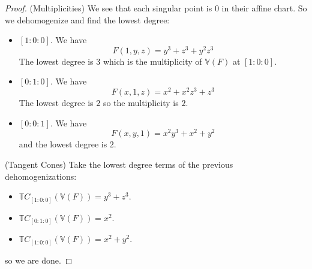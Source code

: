 \documentclass{article}
\begin{document}
\begin{itemize}
\begin{proof}
                (Multiplicities) We see that each singular point is $0$ in their affine chart. So we dehomogenize and find the lowest degree:
                    \begin{itemize}
                        \item $[1 : 0 : 0]$. We have
                            \begin{equation*}
                                F(1, y, z) = y^{3} + z^{3} + y^{2}z^{3}
                            \end{equation*}
                        The lowest degree is $3$ which is the multiplicity of $\mathbb{V}(F)$ at $[1 : 0 : 0]$.

                        \item $[0 : 1 : 0]$. We have
                            \begin{equation*}
                                F(x, 1, z) = x^{2} + x^{2}z^{3} + z^{3}
                            \end{equation*}
                        The lowest degree is $2$ so the multiplicity is $2$.

                        \item $[0 : 0 : 1]$. We have 
                            \begin{equation*}
                                F(x, y, 1) = x^{2}y^{3} + x^{2} + y^{2}
                            \end{equation*}
                        and the lowest degree is $2$.
                    \end{itemize}
                (Tangent Cones) Take the lowest degree terms of the previous dehomogenizations:
                    \begin{itemize}
                        \item $\mathbb{T}C_{[1 : 0 : 0]}(\mathbb{V}(F)) = y^{3} + z^{3}$.

                        \item $\mathbb{T}C_{[0 : 1 : 0]}(\mathbb{V}(F)) = x^{2}$.

                        \item $\mathbb{T}C_{[1 : 0 : 0]}(\mathbb{V}(F)) = x^{2} + y^{2}$. 
                    \end{itemize}
                so we are done.
            \end{proof}


\end{itemize}
\end{document}
